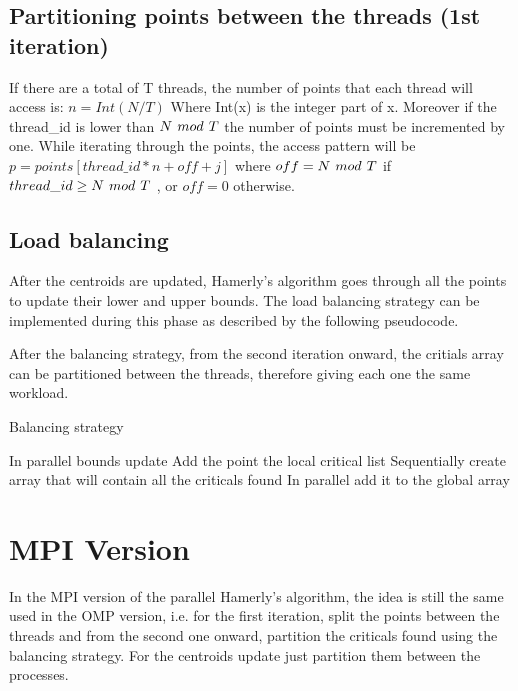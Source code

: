 \documentclass[conference]{IEEEtran}
\begin{document}
\subsection{Partitioning points between the threads (1st iteration)}
If there are a total of T threads, the number of points that each thread will access is: $n = Int(N / T)$
Where Int(x) is the integer part of x. Moreover if the thread\_id is lower than $N\hspace{0.05in} mod\hspace{0.05in} T$ the number of points must be incremented by one. While iterating through the points, the access pattern will be $p = points[ thread\_id * n + off + j]$ where $off = N\hspace{0.05in} mod\hspace{0.05in} T$ if $thread\_id \geq N\hspace{0.05in} mod\hspace{0.05in} T $ , or $off = 0$ otherwise. 

\subsection{Load balancing}

After the centroids are updated, Hamerly's algorithm goes through all the points to update their lower and upper bounds. The load balancing strategy can be implemented during this phase as described by the following pseudocode.

After the balancing strategy, from the second iteration onward, the critials array can be partitioned between the threads, therefore giving each one the same workload.

\begin{algorithm}[H]
    \caption{Balancing strategy}
    \begin{algorithmic}
        \State \Comment In parallel
        \State bounds update
            \State Add the point the local critical list
        \EndIf 
        \EndFor
        \State \Comment Sequentially
        \State create array that will contain all the criticals found
        \State \Comment In parallel
        \State add it to the global array
    \EndFor
    \end{algorithmic}
\end{algorithm}

\section{MPI Version}
In the MPI version of the parallel Hamerly's algorithm, the idea is still the same used in the OMP version, i.e. for the first iteration, split the points between the threads and from the second one onward, partition the criticals found using the balancing strategy. For the centroids update just partition them between the processes. 
\end{document}
